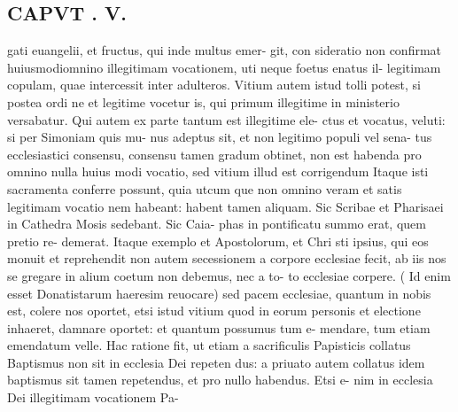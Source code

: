 \documentclass{article}
\begin{document}
\begin{pages}
\section*{CAPVT . V. }
\marginpar{[ p.365 ]}gati euangelii, et fructus, qui inde multus emer- git, con sideratio non confirmat huiusmodiomnino illegitimam vocationem, uti neque foetus enatus il- legitimam copulam, quae intercessit inter adulteros. Vitium autem istud tolli potest, si postea ordi ne et legitime vocetur is, qui primum illegitime in ministerio versabatur. Qui autem ex parte tantum est illegitime ele- ctus et vocatus, veluti: si per Simoniam quis mu- nus adeptus sit, et non legitimo populi vel sena- tus ecclesiastici consensu, consensu tamen gradum obtinet, non est habenda pro omnino nulla huius modi vocatio, sed vitium illud est corrigendum Itaque isti sacramenta conferre possunt, quia utcum que non omnino veram et satis legitimam vocatio nem habeant: habent tamen aliquam. Sic Scribae et Pharisaei in Cathedra Mosis sedebant. Sic Caia- phas in pontificatu summo erat, quem pretio re- demerat. Itaque exemplo et Apostolorum, et Chri sti ipsius, qui eos monuit et reprehendit non autem secessionem a corpore ecclesiae fecit, ab iis nos se gregare in alium coetum non debemus, nec a to- to ecclesiae corpere. ( Id enim esset Donatistarum haeresim reuocare) sed pacem ecclesiae, quantum in nobis est, colere nos oportet, etsi istud vitium quod in eorum personis et electione inhaeret, damnare oportet: et quantum possumus tum e- mendare, tum etiam emendatum velle. Hac ratione fit, ut etiam a sacrificulis Papisticis collatus Baptismus non sit in ecclesia Dei repeten dus: a priuato autem collatus idem baptismus sit tamen repetendus, et pro nullo habendus. Etsi e- nim in ecclesia Dei illegitimam vocationem Pa- 

\end{pages}
\end{document}
